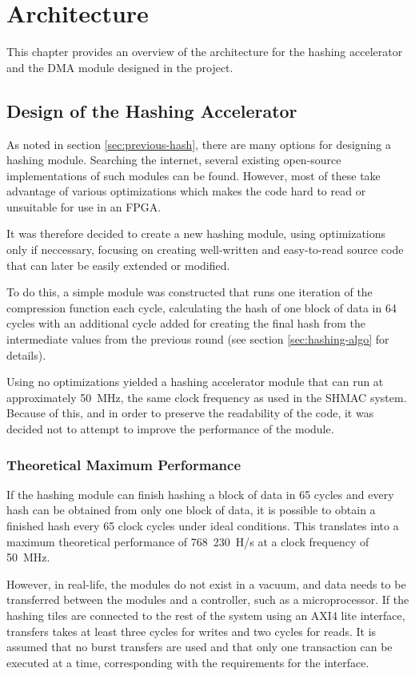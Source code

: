 \chapter{Architecture}
\label{cha:architecture}

This chapter provides an overview of the architecture for the hashing
accelerator and the DMA module designed in the project.

\section{Design of the Hashing Accelerator}

As noted in section \ref{sec:previous-hash}, there are many options for
designing a hashing module. Searching the internet, several existing open-source
implementations of such modules can be found. However, most of these
take advantage of various optimizations which makes the code hard to
read or unsuitable for use in an FPGA.

It was therefore decided to create a new hashing module, using optimizations
only if neccessary, focusing on creating well-written and easy-to-read source
code that can later be easily extended or modified.

To do this, a simple module was constructed that runs one iteration of
the compression function each cycle, calculating the hash of one block
of data in 64 cycles with an additional cycle added for creating the
final hash from the intermediate values from the previous round (see
section \ref{sec:hashing-algo} for details).

Using no optimizations yielded a hashing accelerator module that can
run at approximately 50~MHz, the same clock frequency as used in the SHMAC system.
Because of this, and in order to preserve the readability of the code, it
was decided not to attempt to improve the performance of the module.

\subsection{Theoretical Maximum Performance}
If the hashing module can finish hashing a block of data in 65 cycles and
every hash can be obtained from only one block of data, it is possible to
obtain a finished hash every 65 clock cycles under ideal conditions. This
translates into a maximum theoretical performance of 768~230~H/s at a clock
frequency of 50~MHz.

However, in real-life, the modules do not exist in a vacuum, and data needs to be transferred
between the modules and a controller, such as a microprocessor. If the hashing tiles
are connected to the rest of the system using an AXI4 lite interface, transfers
takes at least three cycles for writes and two cycles for reads.
It is assumed that no burst transfers are used and that only one transaction
can be executed at a time, corresponding with the requirements for the interface.

